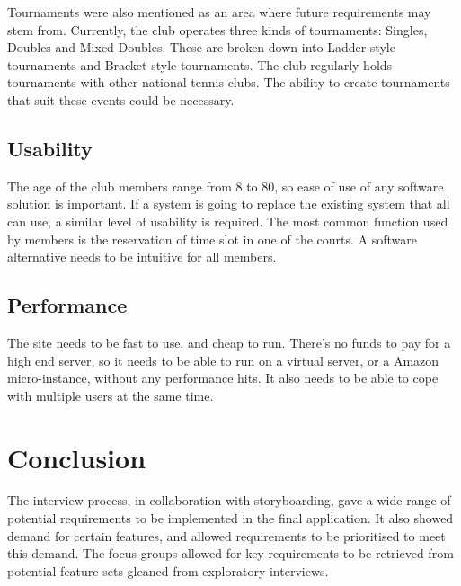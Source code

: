 Tournaments were also mentioned as an area where future requirements may stem from. Currently, the club operates three kinds of tournaments: Singles, Doubles and Mixed Doubles. These are broken down into Ladder style tournaments and Bracket style tournaments. The club regularly holds tournaments with other national tennis clubs. The ability to create tournaments that suit these events could be necessary.

\subsection{Usability}

The age of the club members range from 8 to 80, so ease of use of any software solution is important. If a system is going to replace the existing system that all can use, a similar level of usability is required. The most common function used by members is the reservation of time slot in one of the courts. A software alternative needs to be intuitive for all members.

\subsection{Performance}

The site needs to be fast to use, and cheap to run. There's no funds to pay for a high end server, so it needs to be able to run on a virtual server, or a Amazon micro-instance, without any performance hits. It also needs to be able to cope with multiple users at the same time. 

\section{Conclusion}

The interview process, in collaboration with storyboarding, gave a wide range of potential requirements to be implemented in the final application. It also showed demand for certain features, and allowed requirements to be prioritised to meet this demand. The focus groups allowed for key requirements to be retrieved from potential feature sets gleaned from exploratory interviews.